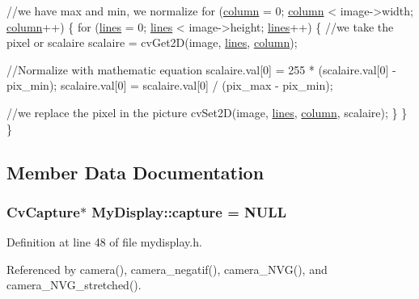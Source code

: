 \begin{DoxyCode}
    \textcolor{comment}{//we have max and min, we normalize}
    \textcolor{keywordflow}{for} (\hyperlink{classMyDisplay_a94a51f56cd8e8c5b6e22f5634b5d5f12}{column} = 0; \hyperlink{classMyDisplay_a94a51f56cd8e8c5b6e22f5634b5d5f12}{column} < image->width; \hyperlink{classMyDisplay_a94a51f56cd8e8c5b6e22f5634b5d5f12}{column}++)
    \{
        \textcolor{keywordflow}{for} (\hyperlink{classMyDisplay_a2cb48c4b915895b0bc7e7cd0f524a3be}{lines} = 0; \hyperlink{classMyDisplay_a2cb48c4b915895b0bc7e7cd0f524a3be}{lines} < image->height; \hyperlink{classMyDisplay_a2cb48c4b915895b0bc7e7cd0f524a3be}{lines}++)
        \{
            \textcolor{comment}{//we take the pixel or scalaire}
            scalaire = cvGet2D(image, \hyperlink{classMyDisplay_a2cb48c4b915895b0bc7e7cd0f524a3be}{lines}, \hyperlink{classMyDisplay_a94a51f56cd8e8c5b6e22f5634b5d5f12}{column});

            \textcolor{comment}{//Normalize with mathematic equation}
            scalaire.val[0] = 255 * (scalaire.val[0] - pix\_min);
            scalaire.val[0] = scalaire.val[0] / (pix\_max - pix\_min);

            \textcolor{comment}{//we replace the pixel in the picture}
            cvSet2D(image, \hyperlink{classMyDisplay_a2cb48c4b915895b0bc7e7cd0f524a3be}{lines}, \hyperlink{classMyDisplay_a94a51f56cd8e8c5b6e22f5634b5d5f12}{column}, scalaire);
        \}
    \}
\}
\end{DoxyCode}


\subsection{Member Data Documentation}
\hypertarget{classMyDisplay_aa2d469497bae80c2dc6596542a6af041}{
\subsubsection[{capture}]{\setlength{\rightskip}{0pt plus 5cm}Cv\-Capture$\ast$ My\-Display\-::capture = N\-U\-L\-L\hspace{0.3cm}{\ttfamily [private]}}}\label{classMyDisplay_aa2d469497bae80c2dc6596542a6af041}


Definition at line 48 of file mydisplay.\-h.



Referenced by camera(), camera\-\_\-negatif(), camera\-\_\-\-N\-V\-G(), and camera\-\_\-\-N\-V\-G\-\_\-stretched().

